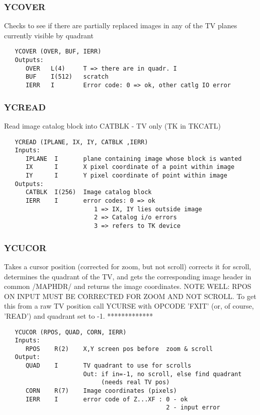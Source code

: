 \subsubsection{YCOVER}
Checks to see if there are partially replaced images in any
of the TV planes currently visible by quadrant
\begin{verbatim}
   YCOVER (OVER, BUF, IERR)
   Outputs:
      OVER   L(4)     T => there are in quadr. I
      BUF    I(512)   scratch
      IERR   I        Error code: 0 => ok, other catlg IO error

\end{verbatim}

\subsubsection{YCREAD}
Read image catalog block into CATBLK - TV only (TK in TKCATL)
\begin{verbatim}
   YCREAD (IPLANE, IX, IY, CATBLK ,IERR)
   Inputs:
      IPLANE  I       plane containing image whose block is wanted
      IX      I       X pixel coordinate of a point within image
      IY      I       Y pixel coordinate of point within image
   Outputs:
      CATBLK  I(256)  Image catalog block
      IERR    I       error codes: 0 => ok
                         1 => IX, IY lies outside image
                         2 => Catalog i/o errors
                         3 => refers to TK device

\end{verbatim}

\subsubsection{YCUCOR}
Takes a cursor position (corrected for zoom, but not scroll)
corrects it for scroll, determines the quadrant of the TV, and gets
the corresponding image header in common /MAPHDR/ and returns the
image coordinates.
NOTE WELL: RPOS ON INPUT MUST BE CORRECTED FOR ZOOM AND NOT SCROLL.
To get this from a raw TV position call YCURSE with OPCODE 'FXIT'
(or, of course, 'READ') and quadrant set to -1.    *************
\begin{verbatim}
   YCUCOR (RPOS, QUAD, CORN, IERR)
   Inputs:
      RPOS    R(2)    X,Y screen pos before  zoom & scroll
   Output:
      QUAD    I       TV quadrant to use for scrolls
                      Out: if in=-1, no scroll, else find quadrant
                           (needs real TV pos)
      CORN    R(7)    Image coordinates (pixels)
      IERR    I       error code of Z...XF : 0 - ok
                                             2 - input error

\end{verbatim}

